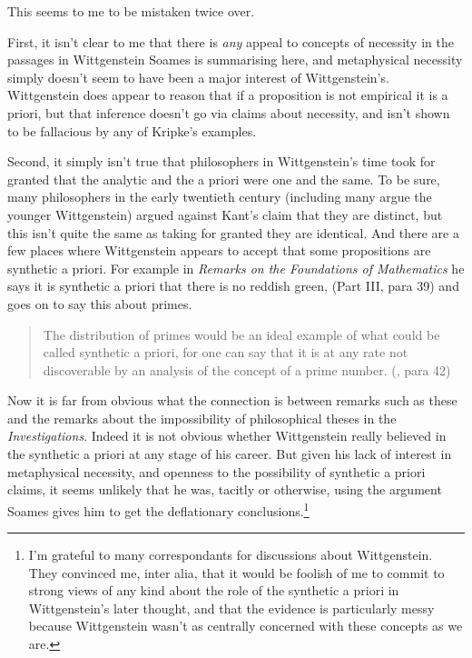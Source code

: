\documentclass[
  11pt,
  letterpaper,
  DIV=11,
  numbers=noendperiod,
  twoside]{scrartcl}
\begin{document}
This seems to me to be mistaken twice over.

First, it isn't clear to me that there is \emph{any} appeal to concepts
of necessity in the passages in Wittgenstein Soames is summarising here,
and metaphysical necessity simply doesn't seem to have been a major
interest of Wittgenstein's. Wittgenstein does appear to reason that if a
proposition is not empirical it is a priori, but that inference doesn't
go via claims about necessity, and isn't shown to be fallacious by any
of Kripke's examples.

Second, it simply isn't true that philosophers in Wittgenstein's time
took for granted that the analytic and the a priori were one and the
same. To be sure, many philosophers in the early twentieth century
(including many argue the younger Wittgenstein) argued against Kant's
claim that they are distinct, but this isn't quite the same as taking
for granted they are identical. And there are a few places where
Wittgenstein appears to accept that some propositions are synthetic a
priori. For example in \emph{Remarks on the Foundations of Mathematics}
he says it is synthetic a priori that there is no reddish green, (Part
III, para 39) and goes on to say this about primes.

\begin{quote}
The distribution of primes would be an ideal example of what could be
called synthetic a priori, for one can say that it is at any rate not
discoverable by an analysis of the concept of a prime number.
(, para 42)
\end{quote}

Now it is far from obvious what the connection is between remarks such
as these and the remarks about the impossibility of philosophical theses
in the \emph{Investigations}. Indeed it is not obvious whether
Wittgenstein really believed in the synthetic a priori at any stage of
his career. But given his lack of interest in metaphysical necessity,
and openness to the possibility of synthetic a priori claims, it seems
unlikely that he was, tacitly or otherwise, using the argument Soames
gives him to get the deflationary conclusions.\footnote{I'm grateful to
  many correspondants for discussions about Wittgenstein. They convinced
  me, inter alia, that it would be foolish of me to commit to strong
  views of any kind about the role of the synthetic a priori in
  Wittgenstein's later thought, and that the evidence is particularly
  messy because Wittgenstein wasn't as centrally concerned with these
  concepts as we are.}
\end{document}
